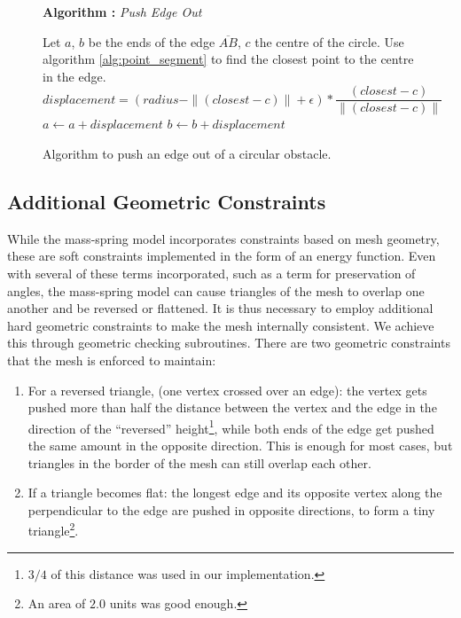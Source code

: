 \documentclass[journal]{IEEEtran}
\newcounter{algorithm}
\newenvironment{algorithmicieee}[1]
  {\refstepcounter{algorithm}
   \begin{lrbox}{\ieeealgbox}
   \begin{minipage}{\dimexpr\columnwidth-2\fboxsep-2\fboxrule}
   \textbf{Algorithm \arabic{algorithm}:} \textit{#1} \par
   \begin{algorithmic}[1]}
  {\end{algorithmic}
   \end{minipage}
   \end{lrbox}\noindent\fbox{\usebox{\ieeealgbox}}}
\newcommand{\comment}[1]{{\color{red} #1}}
\begin{document}
\begin{figure}
  \begin{algorithmicieee}{Push Edge Out}\label{alg:push_edge}
 \STATE Let $a$, $b$ be the ends of the edge $\overline{AB}$, $c$ the centre of the circle.  Use algorithm \ref{alg:point_segment} to find the closest point to the centre in the edge.
  \STATE $displacement = (radius - \|(closest - c)\| + \epsilon) * \dfrac{(closest - c)}{\|(closest - c)\|}$
  \STATE $ a \gets a + displacement$
  \STATE $ b \gets b + displacement$
 \ENDIF
\end{algorithmicieee}
 \caption{Algorithm to push an edge out of a circular obstacle.}
\end{figure}

\subsection{\comment{Additional} Geometric Constraints}
\comment{While the mass-spring model incorporates constraints based on mesh geometry, these are soft constraints implemented in the form of an energy function. Even with several of these terms incorporated, such as a term for preservation of angles, the mass-spring model can cause triangles of the mesh to overlap one another and be reversed or flattened.  It is thus necessary to employ additional hard geometric constraints to make the mesh internally consistent.  We achieve this through geometric checking subroutines.}  There are two geometric constraints that the mesh is enforced to maintain:

\begin{enumerate}
 \item For a reversed triangle, (one vertex crossed over an edge): the vertex gets pushed more than half the distance between the vertex and the edge in the direction of the ``reversed'' height\footnote{$3/4$ of this distance was used in our implementation.}, while both ends of the edge get pushed the same amount in the opposite direction.  This is enough for most cases, but triangles in the border of the mesh can still overlap each other.

 \item If a triangle becomes flat: the longest edge and its opposite vertex along the perpendicular to the edge are pushed in opposite directions, to form a tiny triangle\footnote{An area of $2.0$ units was good enough.}.
\end{enumerate}
\end{document}

